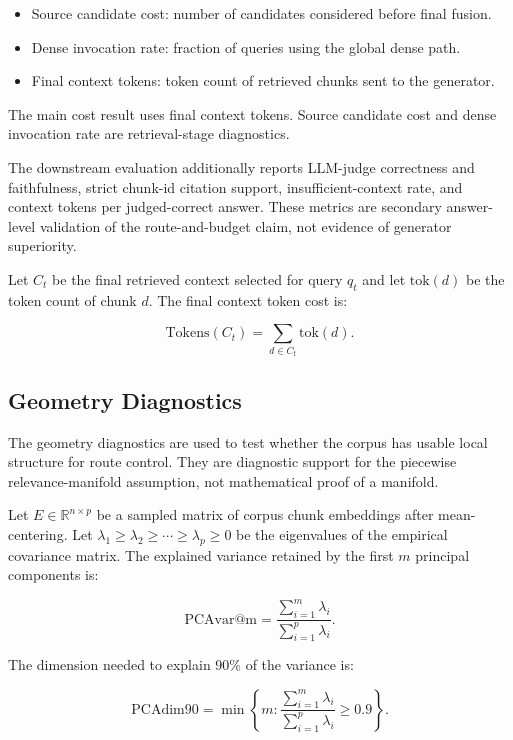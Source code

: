 \begin{itemize}
\item Source candidate cost: number of candidates considered before final fusion.
\item Dense invocation rate: fraction of queries using the global dense path.
\item Final context tokens: token count of retrieved chunks sent to the generator.
\end{itemize}

The main cost result uses final context tokens. Source candidate cost and dense invocation rate are retrieval-stage diagnostics.

The downstream evaluation additionally reports LLM-judge correctness and faithfulness, strict chunk-id citation support, insufficient-context rate, and context tokens per judged-correct answer. These metrics are secondary answer-level validation of the route-and-budget claim, not evidence of generator superiority.

Let $C_t$ be the final retrieved context selected for query $q_t$ and let $\mathrm{tok}(d)$ be the token count of chunk $d$. The final context token cost is:

\[
\mathrm{Tokens}(C_t) =
\sum_{d \in C_t} \mathrm{tok}(d).
\]

\subsection{Geometry Diagnostics}
\label{sec:05-experimental-setup:geometry-diagnostics}

The geometry diagnostics are used to test whether the corpus has usable local structure for route control. They are diagnostic support for the piecewise relevance-manifold assumption, not mathematical proof of a manifold.

Let $E \in \mathbb{R}^{n \times p}$ be a sampled matrix of corpus chunk embeddings after mean-centering. Let $\lambda_1 \ge \lambda_2 \ge \cdots \ge \lambda_p \ge 0$ be the eigenvalues of the empirical covariance matrix. The explained variance retained by the first $m$ principal components is:

\[
\mathrm{PCAvar@m} =
\frac{\sum_{i=1}^{m} \lambda_i}
     {\sum_{i=1}^{p} \lambda_i}.
\]

The dimension needed to explain 90\% of the variance is:

\[
\mathrm{PCAdim90} =
\min \left\{m:
\frac{\sum_{i=1}^{m} \lambda_i}
     {\sum_{i=1}^{p} \lambda_i}
\ge 0.9
\right\}.
\]

